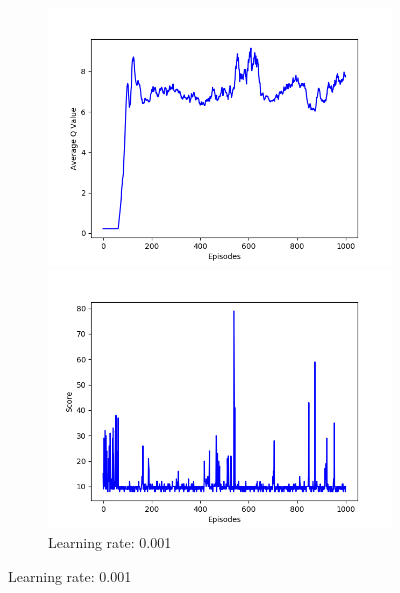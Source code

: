 \documentclass{article}
\begin{document}
\begin{figure}[!htbp]
  \centering
  \begin{subfigure}{\textwidth}
    \begin{minipage}{0.5\textwidth}
      \centering
      \includegraphics[scale=0.45]{../experiments/lr_1E-3/qvalues.png}
    \end{minipage}
    \begin{minipage}{0.5\textwidth}
      \centering
      \includegraphics[scale=0.45]{../experiments/lr_1E-3/scores.png}
    \end{minipage}
    \caption{Learning rate: 0.001}
  \end{subfigure}%


\end{figure}
\end{document}
